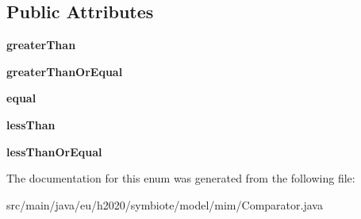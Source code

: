 \subsection*{Public Attributes}
\begin{DoxyCompactItemize}
\item 
\mbox{\label{enumeu_1_1h2020_1_1symbiote_1_1model_1_1mim_1_1Comparator_af94d9952b81a8ffb1d3fdf85c32e92d8}} 
{\bfseries greater\+Than}
\item 
\mbox{\label{enumeu_1_1h2020_1_1symbiote_1_1model_1_1mim_1_1Comparator_a9b324ca89cf8ee9821ef18c958751c67}} 
{\bfseries greater\+Than\+Or\+Equal}
\item 
\mbox{\label{enumeu_1_1h2020_1_1symbiote_1_1model_1_1mim_1_1Comparator_a96fdd534251a8c39b12bcf2eb07f9040}} 
{\bfseries equal}
\item 
\mbox{\label{enumeu_1_1h2020_1_1symbiote_1_1model_1_1mim_1_1Comparator_ae3dd202154e4a68f7d0acca2ee7c990f}} 
{\bfseries less\+Than}
\item 
\mbox{\label{enumeu_1_1h2020_1_1symbiote_1_1model_1_1mim_1_1Comparator_a06742af4fa90f80ae1ccf7c5132d6d72}} 
{\bfseries less\+Than\+Or\+Equal}
\end{DoxyCompactItemize}


The documentation for this enum was generated from the following file\+:\begin{DoxyCompactItemize}
\item 
src/main/java/eu/h2020/symbiote/model/mim/Comparator.\+java\end{DoxyCompactItemize}

